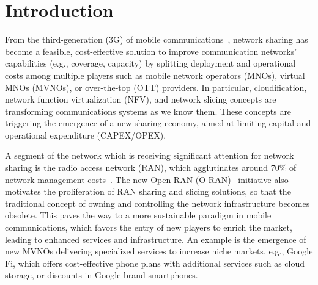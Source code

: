 \documentclass[conference]{IEEEtran}
\theoremstyle{definition}
\begin{document}
\section{Introduction}
From the third-generation (3G) of mobile communications~\cite{frisanco2008infrastructure}\cite{samdanis2016network}, network sharing has become a feasible, cost-effective solution to improve communication networks' capabilities (e.g., coverage, capacity) by splitting deployment and operational costs among multiple players such as mobile network operators (MNOs), virtual MNOs (MVNOs), or over-the-top (OTT) providers.
In particular, cloudification, network function virtualization (NFV), and network slicing concepts are transforming communications systems as we know them. These concepts are triggering the emergence of a new sharing economy, aimed at limiting capital and operational expenditure (CAPEX/OPEX). 

A segment of the network which is receiving significant attention for network sharing is the radio access network (RAN), which agglutinates around 70\% of network management costs~\cite{gsma2019era}. The new Open-RAN (O-RAN)~\cite{yang2013openran} initiative also motivates the proliferation of RAN sharing and slicing solutions, so that the traditional concept of owning and controlling the network infrastructure becomes obsolete. This paves the way to a more sustainable paradigm in mobile communications, which favors the entry of new players to enrich the market, leading to enhanced services and infrastructure. An example is the emergence of new MVNOs delivering specialized services to increase niche markets, e.g., Google Fi, which offers cost-effective phone plans with additional services such as cloud storage, or discounts in Google-brand smartphones. 

\end{document}
